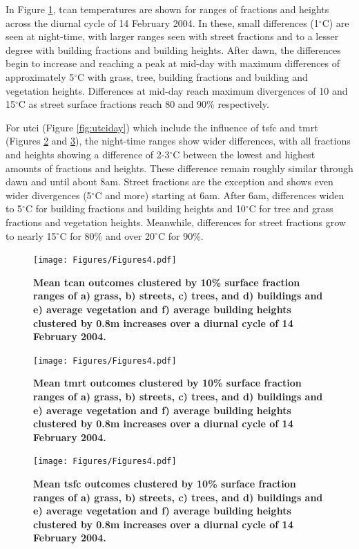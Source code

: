 \documentclass[final,3p,times,authoryear]{elsarticle}
\begin{document}
In Figure \ref{fig:tcanday}, \gls{tcan} temperatures are shown for ranges of fractions and heights across the diurnal cycle of 14 February 2004. In these, small differences (1$^{\circ}$C) are seen at night-time, with larger ranges seen with street fractions and to a lesser degree with building fractions and building heights. After dawn, the differences begin to increase and reaching a peak at mid-day with maximum differences of approximately 5$^{\circ}$C with grass, tree, building fractions and building and vegetation heights. Differences at mid-day reach maximum divergences of 10 and 15$^{\circ}$C as street surface fractions reach 80 and 90\% respectively.

For \gls{utci} (Figure \ref{fig:utciday}) which include the influence of \gls{tsfc} and \gls{tmrt} (Figures \ref{fig:tmrtday} and \ref{fig:tsfcday}), the night-time ranges show wider differences, with all fractions and heights showing a difference of 2-3$^{\circ}$C between the lowest and highest amounts of fractions and heights. These difference remain roughly similar through dawn and until about 8am. Street fractions are the exception and shows even wider divergences (5$^{\circ}$C and more) starting at 6am. After 6am, differences widen to 5$^{\circ}$C for building fractions and building heights and 10$^{\circ}$C for tree and grass fractions and vegetation heights. Meanwhile, differences for street fractions grow to nearly 15$^{\circ}$C for 80\% and over 20$^{\circ}$C for 90\%.




\begin{figure}
\centering
\texttt{[image: Figures/Figures4.pdf]}
\caption{\bf Mean \gls{tcan} outcomes clustered by 10\% surface fraction ranges of a) grass, b) streets, c) trees, and d) buildings and e) average vegetation and f) average building heights clustered by 0.8m increases over a diurnal cycle of 14 February 2004.  }
 \label{fig:tcanday}
\end{figure}

\begin{figure}
\centering
\texttt{[image: Figures/Figures4.pdf]}
\caption{\bf Mean \gls{tmrt} outcomes clustered by 10\% surface fraction ranges of a) grass, b) streets, c) trees, and d) buildings and e) average vegetation and f) average building heights clustered by 0.8m increases over a diurnal cycle of 14 February 2004. }
 \label{fig:tmrtday}
\end{figure}

\begin{figure}
\centering
\texttt{[image: Figures/Figures4.pdf]}
\caption{\bf Mean \gls{tsfc} outcomes clustered by 10\% surface fraction ranges of a) grass, b) streets, c) trees, and d) buildings and e) average vegetation and f) average building heights clustered by 0.8m increases over a diurnal cycle of 14 February 2004. }
 \label{fig:tsfcday}
\end{figure}
\end{document}
